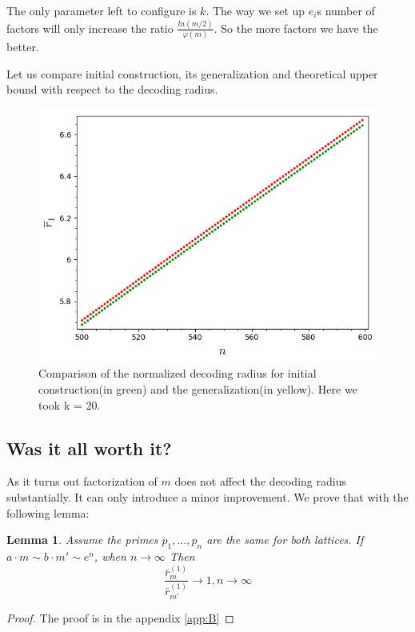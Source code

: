 \documentclass[12pt]{article}
\newtheorem{lemma}{Lemma}
\begin{document}
The only parameter left to configure is $k$. The way we set up $e_i$s number of factors will only increase the ratio $\frac{ln(m/2)}{\varphi(m)}$. So the more factors we have the better.

Let us compare initial construction, its generalization and theoretical upper bound with respect to the decoding radius.

\begin{figure}
  \includegraphics[width=\linewidth]{plot4.png}
  \caption{Comparison of the normalized decoding radius for initial construction(in green) and the generalization(in yellow). Here we took k = 20. }
  \label{fig:gen_int}
\end{figure}


\subsection{Was it all worth it?}
\label{subsec:improvement_integers}


As it turns out factorization of $m$ does not affect the decoding radius substantially. It can only introduce a minor improvement. We prove that with the following lemma:

\begin{lemma}\label{lemma:no_imrovement}
Assume the primes $p_{1}, \dots, p_{n}$ are the same for both lattices. If $a \cdot m \sim b \cdot m' \sim e^n$, when $n \rightarrow \infty$ Then
\[
    \frac{\bar r_{m}^{(1)}}{\bar r_{m'}^{(1)}} \rightarrow 1, n \rightarrow \infty
\]
\end{lemma}
\begin{proof}
    The proof is in the appendix \ref{app:B}
\end{proof}
\end{document}
